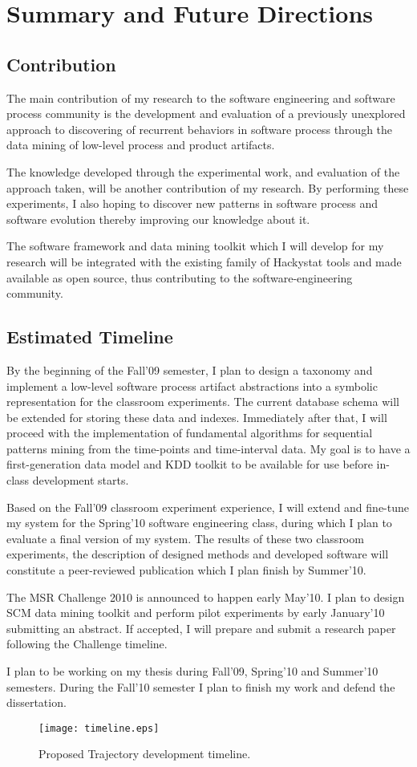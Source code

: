 \chapter{Summary and Future Directions} \label{contribution}

\section{Contribution}
The main contribution of my research to the software engineering and software process community is the development and evaluation of a previously unexplored approach to discovering of recurrent behaviors in software process through the data mining of low-level process and product artifacts.

The knowledge developed through the experimental work, and evaluation of the approach taken, will be another contribution of my research. By performing these experiments, I also hoping to discover new patterns in software process and software evolution thereby improving our knowledge about it.

The software framework and data mining toolkit which I will develop for my research will be integrated with the existing family of Hackystat tools and made available as open source, thus contributing to the software-engineering community.

\section{Estimated Timeline}
By the beginning of the Fall'09 semester, I plan to design a taxonomy and implement a low-level software process artifact abstractions into a symbolic representation for the classroom experiments. The current database schema will be extended for storing these data and indexes. Immediately after that, I will proceed with the implementation of fundamental algorithms for sequential patterns mining from the time-points and time-interval data. My goal is to have a first-generation data model and KDD toolkit to be available for use before in-class development starts. 

Based on the Fall'09 classroom experiment experience, I will extend and fine-tune my system for the Spring'10 software engineering class, during which I plan to evaluate a final version of my system. The results of these two classroom experiments, the description of designed methods and developed software will constitute a peer-reviewed publication which I plan finish by Summer'10.

The MSR Challenge 2010 is announced to happen early May'10. I plan to design SCM data mining toolkit and perform pilot experiments by early January'10 submitting an abstract. If accepted, I will prepare and submit a research paper following the Challenge timeline.

I plan to be working on my thesis during Fall'09, Spring'10 and Summer'10 semesters. During the Fall'10 semester I plan to finish my work and defend the dissertation.

\begin{figure}[tbp]
   \centering
   \texttt{[image: timeline.eps]}
   \caption{Proposed Trajectory development timeline.}
   \label{fig:timeline}
\end{figure}